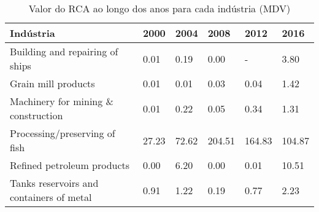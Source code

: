 \begin{table}
\centering
\caption{Valor do RCA ao longo dos anos para cada indústria (MDV)}
\label{tab:ex3-tempo-MDV}
\begin{tabular}{p{6cm}p{1.5cm}p{1.5cm}p{1.5cm}p{1.5cm}p{1.5cm}}
\toprule
                               Indústria &  2000 &  2004 &   2008 &   2012 &   2016 \\
\midrule
         Building and repairing of ships &  0.01 &  0.19 &   0.00 &      - &   3.80 \\
                     Grain mill products &  0.01 &  0.01 &   0.03 &   0.04 &   1.42 \\
     Machinery for mining \& construction &  0.01 &  0.22 &   0.05 &   0.34 &   1.31 \\
           Processing/preserving of fish & 27.23 & 72.62 & 204.51 & 164.83 & 104.87 \\
              Refined petroleum products &  0.00 &  6.20 &   0.00 &   0.01 &  10.51 \\
Tanks reservoirs and containers of metal &  0.91 &  1.22 &   0.19 &   0.77 &   2.23 \\
\bottomrule
\end{tabular}
\end{table}
